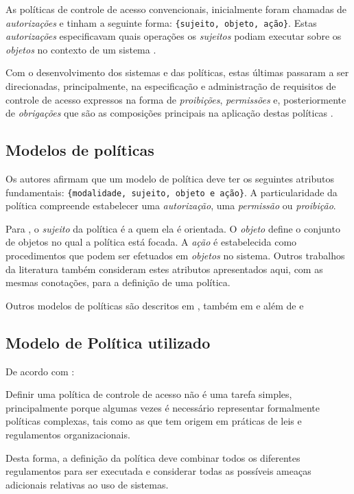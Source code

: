 As políticas de controle de acesso convencionais, inicialmente foram chamadas de \textit{autorizações} e tinham a seguinte forma: \verb|{sujeito, objeto, ação}|. Estas \textit{autorizações} especificavam quais operações os \textit{sujeitos} podiam executar sobre os \textit{objetos} no contexto de um sistema \cite{di_vimercati_policies_2005}\cite{sarkis2017}.

Com o desenvolvimento dos sistemas e das políticas, estas últimas passaram a ser direcionadas, principalmente, na especificação e administração de requisitos de controle de acesso expressos na forma de \textit{proibições}, \textit{permissões }e, posteriormente de \textit{obrigações} que são as composições principais na aplicação destas políticas \cite{sarkar_2017}.

\subsection{Modelos de políticas}\label{modelo_politicas}
Os autores  afirmam que um modelo de política deve ter os seguintes atributos fundamentais: \verb|{modalidade, sujeito, objeto e ação}|. A particularidade da política compreende estabelecer uma \textit{autorização}, uma \textit{permissão} ou \textit{proibição}. 

Para , o \textit{sujeito }da política é a quem ela é orientada. O \textit{objeto} define o conjunto de objetos no qual a política está focada. A \textit{ação} é estabelecida como procedimentos que podem ser efetuados em \textit{objetos} no sistema. Outros trabalhos da literatura também consideram estes atributos apresentados aqui, com as mesmas conotações, para a definição de uma política. \cite{sarkis2017}

Outros modelos de políticas são descritos em , também em  e  além de  e 

\subsection{Modelo de Política utilizado}\label{modelo_politica_utilizada}
De acordo com :
\begin{citacao}
	Definir uma política de controle de acesso não é uma tarefa simples, principalmente porque algumas vezes é necessário representar formalmente políticas complexas, tais como as que tem origem em práticas de leis e regulamentos organizacionais.
\end{citacao} 
Desta forma, a definição da política deve combinar todos os diferentes regulamentos para ser executada e considerar todas as possíveis ameaças adicionais relativas ao uso de sistemas. \cite{di_vimercati_policies_2005}

